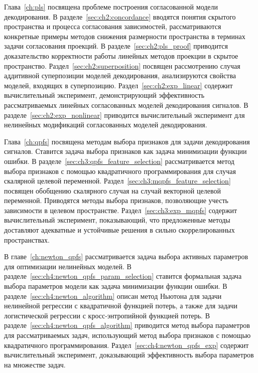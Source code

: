 Глава~\ref{ch:pls} посвящена проблеме построения согласованной модели декодирования.
В разделе~\ref{sec:ch2:concordance} вводятся понятия скрытого пространства и процесса согласования зависимостей, рассматриваются конкретные примеры методов снижения размерности пространства в терминах задачи согласования проекций.
В разделе~\ref{sec:ch2:pls_proof} приводится доказательство корректности работы линейных методов проекции в скрытое пространство.
Раздел~\ref{sec:ch2:superposition} посвящен рассмотрению случая аддитивной суперпозиции моделей декодирования, анализируются свойства моделей, входящих в суперпозицию.
Раздел~\ref{sec:ch2:exp_linear} содержит вычислительный эксперимент, демонстрирующий эффективность рассматриваемых линейных согласованных моделей декодирования сигналов.
В разделе~\ref{sec:ch2:exp_nonlinear} приводится вычислительный эксперимент для нелинейных модификаций согласованных моделей декодирования.

Глава~\ref{ch:qpfs} посвящена методам выбора признаков для задачи декодирования сигналов. 
Ставится задача выбора признаков как задача минимизации функции ошибки.
В разделе~\ref{sec:ch3:qpfs_feature_selection} рассматривается метод выбора признаков с помощью квадратичного программирования для случая скалярной целевой переменной.
Раздел~\ref{sec:ch3:mqpfs_feature_selection} посвящен обобщению скалярного случая на случай векторной целевой переменной.
Приводятся методы выбора признаков, позволяющие учесть зависимости в целевом пространстве.
Раздел~\ref{sec:ch3:exp_mqpfs} содержит вычислительный эксперимент, показывающий, что предложенные методы доставляют адекватные и устойчивые решения в сильно скоррелированных пространствах.

В главе~\ref{ch:newton_qpfs} рассматривается задача выбора активных параметров для оптимизации нелинейных моделей.
В разделе~\ref{sec:ch4:newton_qpfs_param_selection} ставится формальная задача выбора параметров модели как задача минимизации функции ошибки.
В разделе~\ref{sec:ch4:newton_algorithm} описан метод Ньютона для задачи нелинейной регрессии с квадратичной функцией потерь, а также для задачи логистической регрессии с кросс-энтропийной функцией потерь.
В разделе~\ref{sec:ch4:newton_qpfs_algorithm} приводится метод выбора параметров для рассматриваемых задач, использующий метод выбора признаков с помощью квадратичного программирования.
Раздел~\ref{sec:ch4:newton_qpfs_exp} содержит вычислительный эксперимент, доказывающий эффективность выбора параметров на множестве задач.

